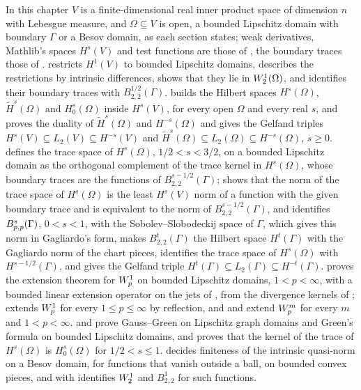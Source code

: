 In this chapter $V$ is a finite-dimensional real inner product space of dimension $n$ with
Lebesgue measure, and $\Omega \subseteq V$ is open, a bounded Lipschitz domain with boundary
$\Gamma$ or a Besov domain, as each section states; weak derivatives, Mathlib's spaces $H^s(V)$ and test functions
are those of , the boundary traces those of .
 restricts $H^1(V)$ to bounded Lipschitz domains, describes the
restrictions by intrinsic differences, shows that they lie in $W^{1}_{2}(\Omega)$, and
identifies their boundary traces with $B^{1/2}_{2,2}(\Gamma)$.
 builds the Hilbert spaces $H^s(\Omega)$,
$\tilde H^s(\Omega)$ and $H^s_0(\Omega)$ inside $H^s(V)$, for every open $\Omega$ and every real
$s$, and  proves the duality of $\tilde H^s(\Omega)$ and
$H^{-s}(\Omega)$ and gives the Gelfand triples $H^s(V) \subseteq L_2(V) \subseteq H^{-s}(V)$ and
$\tilde H^s(\Omega) \subseteq L_2(\Omega) \subseteq H^{-s}(\Omega)$, $s \geq 0$.
 defines the trace space of $H^s(\Omega)$,
$1/2 < s < 3/2$, on a bounded Lipschitz domain as the orthogonal complement of the trace kernel
in $H^s(\Omega)$, whose boundary traces are the functions of $B^{s-1/2}_{2,2}(\Gamma)$;
 shows that the norm of the trace space of $H^s(\Omega)$ is the
least $H^s(V)$ norm of a function with the given boundary trace and is equivalent to the norm
of $B^{s-1/2}_{2,2}(\Gamma)$, and
 identifies $B^{s}_{p,p}(\Gamma)$, $0 < s < 1$, with the
Sobolev--Slobodeckij space of $\Gamma$, which gives this norm in Gagliardo's form, makes
$B^t_{2,2}(\Gamma)$ the Hilbert space $H^t(\Gamma)$ with the Gagliardo norm of the chart pieces,
identifies the trace space of $H^s(\Omega)$ with $H^{s-1/2}(\Gamma)$, and gives the Gelfand
triple $H^t(\Gamma) \subseteq L_2(\Gamma) \subseteq H^{-t}(\Gamma)$.
 proves the extension theorem for $W^{1}_{p}$ on bounded
Lipschitz domains, $1 < p < \infty$, with a bounded linear extension operator on the jets of
, from the divergence kernels of ;
 extends $W^{1}_{p}$ for every $1 \leq p \leq \infty$ by
reflection, and
 and  extend
$W^{m}_{p}$ for every $m$ and $1 < p < \infty$.
 and
 prove Gauss--Green on Lipschitz graph domains and Green's
formula on bounded Lipschitz domains, and  proves that the kernel of the
trace of $H^s(\Omega)$ is $H^s_0(\Omega)$ for $1/2 < s \leq 1$.
 decides
finiteness of the intrinsic quasi-norm on a Besov domain, for functions that vanish outside a
ball, on bounded convex pieces, and with  identifies $W^{1}_{2}$ and
$B^1_{2,2}$ for such functions.

